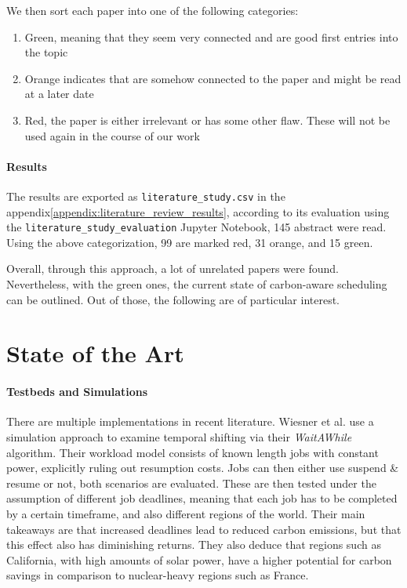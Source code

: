 We then sort each paper into one of the following categories:

\begin{enumerate}
    \item Green, meaning that they seem very connected and are good first entries into the topic
    \item Orange indicates that are somehow connected to the paper and might be read at a later date
    \item Red, the paper is either irrelevant or has some other flaw. These will not be used again in the course of our work
\end{enumerate}

\paragraph{Results}

The results are exported as \verb|literature_study.csv| in the appendix\ref{appendix:literature_review_results}, according to its evaluation using the \verb|literature_study_evaluation| Jupyter Notebook, 145 abstract were read. 
Using the above categorization, 99 are marked red, 31 orange, and 15 green.

Overall, through this approach, a lot of unrelated papers were found.
Nevertheless, with the green ones, the current state of carbon-aware scheduling can be outlined.
Out of those, the following are of particular interest.

\section{State of the Art}

\paragraph{Testbeds and Simulations}
There are multiple implementations in recent literature. Wiesner et al. \cite{wiesner_lets_2021} use a simulation approach to examine temporal shifting via their \emph{WaitAWhile} algorithm. Their workload model consists of known length jobs with constant power, explicitly ruling out resumption costs. 
Jobs can then either use suspend \& resume or not, both scenarios are evaluated. 
These are then tested under the assumption of different job deadlines, meaning that each job has to be completed by a certain timeframe, and also different regions of the world.
Their main takeaways are that increased deadlines lead to reduced carbon emissions, but that this effect also has diminishing returns. 
They also deduce that regions such as California, with high amounts of solar power, have a higher potential for carbon savings in comparison to nuclear-heavy regions such as France.

